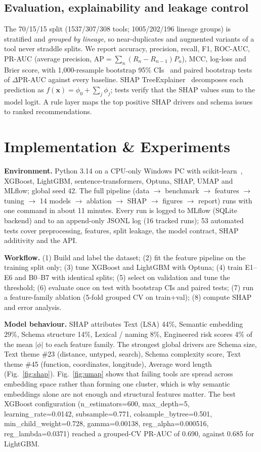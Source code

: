 \documentclass[conference]{IEEEtran}
\begin{document}
\subsection{Evaluation, explainability and leakage control}
The 70/15/15 split (1537/307/308 tools; 1005/202/196 lineage groups) is stratified and \emph{grouped by lineage}, so near-duplicates and augmented variants of a tool never straddle splits. We report accuracy, precision, recall, F1, ROC-AUC, PR-AUC (average precision, $\mathrm{AP}=\sum_n (R_n-R_{n-1})P_n$), MCC, log-loss and Brier score, with 1{,}000-resample bootstrap 95\% CIs~\cite{efron} and paired bootstrap tests of $\Delta$PR-AUC against every baseline. SHAP TreeExplainer~\cite{shap} decomposes each prediction as $f(\mathbf{x})=\phi_0+\sum_j\phi_j$; tests verify that the SHAP values sum to the model logit. A rule layer maps the top positive SHAP drivers and schema issues to ranked recommendations.

\section{Implementation \& Experiments}
\textbf{Environment.} Python 3.14 on a CPU-only Windows PC with scikit-learn~\cite{sklearn}, XGBoost, LightGBM, sentence-transformers, Optuna, SHAP, UMAP and MLflow; global seed 42. The full pipeline (data $\rightarrow$ benchmark $\rightarrow$ features $\rightarrow$ tuning $\rightarrow$ 14 models $\rightarrow$ ablation $\rightarrow$ SHAP $\rightarrow$ figures $\rightarrow$ report) runs with one command in about 11 minutes. Every run is logged to MLflow (SQLite backend) and to an append-only JSONL log (16 tracked runs); 53 automated tests cover preprocessing, features, split leakage, the model contract, SHAP additivity and the API.

\textbf{Workflow.} (1) Build and label the dataset; (2) fit the feature pipeline on the training split only; (3) tune XGBoost and LightGBM with Optuna; (4) train E1--E6 and B0--B7 with identical splits; (5) select on validation and tune the threshold; (6) evaluate once on test with bootstrap CIs and paired tests; (7) run a feature-family ablation (5-fold grouped CV on train+val); (8) compute SHAP and error analysis.

\textbf{Model behaviour.} SHAP attributes Text (LSA) 44\%, Semantic embedding 29\%, Schema structure 14\%, Lexical / naming 8\%, Engineered risk scores 4\% of the mean $|\phi|$ to each feature family. The strongest global drivers are Schema size, Text theme \#23 (distance, untyped, search), Schema complexity score, Text theme \#45 (function, coordinates, longitude), Average word length (Fig.~\ref{fig:shap}). Fig.~\ref{fig:umap} shows that failing tools are spread across embedding space rather than forming one cluster, which is why semantic embeddings alone are not enough and structural features matter. The best XGBoost configuration (n\_estimators=600, max\_depth=5, learning\_rate=0.0142, subsample=0.771, colsample\_bytree=0.501, min\_child\_weight=0.728, gamma=0.00138, reg\_alpha=0.000516, reg\_lambda=0.0371) reached a grouped-CV PR-AUC of 0.690, against 0.685 for LightGBM.
\end{document}
